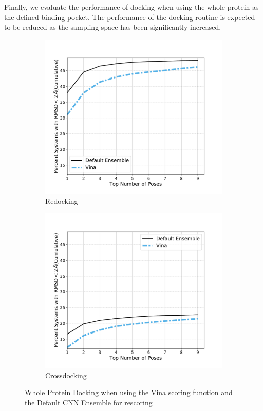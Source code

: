 \documentclass[journal=jcisd8,manuscript=article]{achemso}
\begin{document}
Finally, we evaluate the performance of docking when using the whole protein as the defined binding pocket. The performance of the docking routine is expected to be reduced as the sampling space has been significantly increased.
\begin{figure}    
        \begin{subfigure}[b]{0.48\textwidth}    
		\centering
		\includegraphics[width=\textwidth]{figures/redocking/whole_ptn_comparison_line.pdf}
		\caption{Redocking}
		\label{fig:WholeProteinRD}
        \end{subfigure}    
        \begin{subfigure}[b]{0.48\textwidth}    
		\centering
		\includegraphics[width=\textwidth]{figures/crossdocking/whole_ptn_comparison_line.pdf}
		\caption{Crossdocking}
		\label{fig:WholeProteinCD}
        \end{subfigure}    
	\caption{Whole Protein Docking when using the Vina scoring function and the Default CNN Ensemble for rescoring}
	\label{fig:WholeProtein}
\end{figure}    
\end{document}
